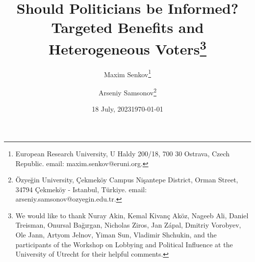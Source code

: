 \documentclass[12pt,english]{article}
\date{{\large 18 July, 2023}}
\begin{document}
\title{Should Politicians be Informed? \\ Targeted Benefits and Heterogeneous Voters\thanks{We would like to thank Nuray Akin, Kemal Kivanç Aköz, Nageeb Ali, Daniel Treisman, Onursal Bağırgan, Nicholas Ziros, Jan Z\'{a}pal, Dmitriy Vorobyev, Ole Jann, Artyom Jelnov, Yiman Sun, Vladimir Shchukin, and the participants of the Workshop on Lobbying and Political Influence at the University of Utrecht for their helpful comments.}}
\author{
        Maxim Senkov\thanks{European Research University, U Haldy 200/18, 700 30 Ostrava, Czech Republic. email: maxim.senkov@eruni.org.} \\
        \and
	Arseniy Samsonov\thanks{Özyeğin University, Çekmeköy Campus Nişantepe District, Orman Street, 34794 Çekmeköy - Istanbul, Türkiye.
 email: arseniy.samsonov@ozyegin.edu.tr.}}
\date{\today}
\maketitle
\end{document}
